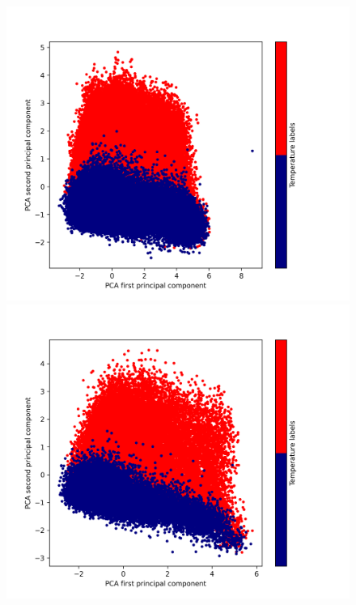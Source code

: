 \documentclass[12pt]{article}
\begin{document}
	\begin{figure}[h!]
		\centering
		\includegraphics[scale=0.45]{003_train_v2_PCA.png}
		\includegraphics[scale=0.45]{003_validate_v2_PCA.png}


\end{figure}
\end{document}

